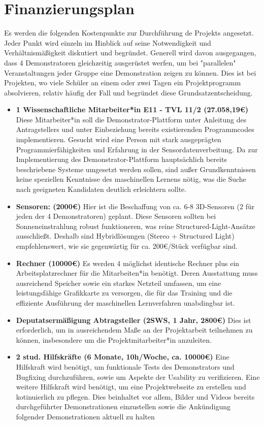 \documentclass[11pt]{article}
\begin{document}
\section{Finanzierungsplan}
Es werden die folgenden Kostenpunkte zur Durchführung de Projekts angesetzt. Jeder Punkt wird einzeln im Hinblick auf seine Notwendigkeit und Verhältnismäßigkeit
diskutiert und begründet. Generell wird davon ausgegangen, dass 4 Demonstratoren gleichzeitig ausgerüstet werfen, um bei "parallelen" Veranstaltungen jeder Gruppe eine Demonstration zeigen zu können. Dies ist bei Projekten, wo viele Schüler an einem oder zwei Tagen ein Projektprogramm absolvieren, relativ häufig der Fall und begründet diese Grundsatzentscheidung.
\begin{itemize}
\item \textbf{1 Wissenschaftliche Mitarbeiter*in E11 - TVL 11/2 (27.058,19\euro)} Diese Mitarbeiter*in soll die Demonstrator-Plattform unter Anleitung des Antragstellers und unter Einbeziehung bereits existierenden Programmcodes implementieren. Gesucht wird eine Person mit stark ausgeprägten Programmierfähigkeiten und Erfahrung in der Sensordatenverbeitung. Da
zur Implementierung des Demonstrator-Plattform hauptsächlich bereits beschriebene Systeme umgesetzt werden sollen, sind außer Grundkenntnissen keine speziellen Kenntnisse des maschinellen Lernens nötig, was die Suche nach geeigneten Kandidaten deutlich erleichtern sollte.
\item \textbf{Sensoren: (2000\euro)} Hier ist die Beschaffung von ca. 6-8 3D-Sensoren (2 für jeden der 4 Demonstratoren) geplant. Diese Sensoren sollten bei Sonneneinstrahlung robust funktioneren, was reine Structured-Light-Ansätze ausschließt. Deshalb sind Hybridlösungen (Stereo + Structured Light) empfehlenswert, wie sie gegenwärtig für ca. 200\euro/Stück verfügbar sind.
\item \textbf{Rechner (10000\euro)} Es werden 4 möglichst identische Rechner plus ein Arbeitsplatzrechner für die Mitarbeiten*in benötigt. Deren Ausstattung muss ausreichend Speicher sowie ein starkes Netzteil umfassen, um eine leistungsfähige Grafikkarte zu versorgen, die für das Training und die effiziente Ausführung der maschinellen Lernverfahren unabdingbar ist.
\item \textbf{Deputatsermäßigung Abtragsteller (2SWS, 1 Jahr, 2800\euro)} Dies ist erforderlich, um in ausreichendem Maße an der Projektarbeit teilnehmen zu können, insbesondere um die Projektmitarbeiter*in anzuleiten.
\item \textbf{2 stud. Hilfskräfte (6 Monate, 10h/Woche, ca. 10000\euro)} Eine Hilfskraft wird benötigt, um funktionale Tests des Demonstrators und Bugfixing durchzuführen, sowie um Aspekte der Usability zu verifizieren. Eine weitere Hilfskraft wird benötigt, um eine Projektwebseite zu erstellen und kotinuierlich zu pflegen. Dies beinhaltet vor allem, Bilder und Videos bereits durchgeführter Demonstrationen einzustellen sowie die Ankündigung folgender Demonstrationen aktuell zu halten
\end{itemize}
\end{document}
